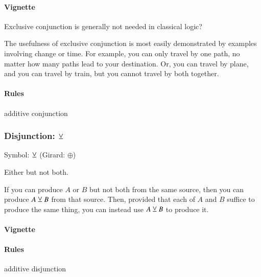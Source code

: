 \documentclass{article}
\begin{document}
\paragraph{Vignette\\}

Exclusive conjunction is generally not needed in classical logic?

The usefulness of exclusive conjunction is most easily demonstrated by
examples involving change or time. For example, you can only travel by
one path, no matter how many paths lead to your destination. Or, you
can travel by plane, and you can travel by train, but you cannot
travel by both together.

\paragraph{Rules} additive conjunction


\subsubsection[Disjunction: either but not both]{Disjunction: \(\veebar\)}

Symbol: \(\veebar\) (Girard: \(\oplus\))

Either but not both.

If you can produce \(A\) or \(B\) but not both from the same source,
then you can produce \(A\veebar B\) from that source.
Then, provided that each of \(A\) and \(B\) suffice to produce
the same thing, you can instead use \(A\veebar B\) to produce it.


\paragraph{Vignette\\}

\paragraph{Rules} additive disjunction
\end{document}
